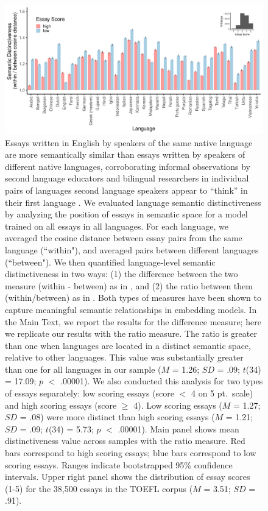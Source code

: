 \documentclass[9pt,twoside,lineno]{pnas-new}
\begin{document}
\begin{figure}[h]
\centering
\includegraphics[width=16.7cm]{suppfigs/distinctiveness_fig.pdf}


  \caption{Essays written in English by speakers of the same native language are more semantically similar than essays written by speakers of different native languages, corroborating informal observations by second language educators and bilingual researchers in individual pairs of languages second language speakers appear to ``think'' in their first language \cite{wu2014influence, filipovic2018speaking}. We evaluated language semantic distinctiveness by analyzing the position of essays in semantic space for a model trained on all essays in all languages. For each language, we averaged the cosine distance between essay pairs from the same language (``within"), and averaged  pairs between different languages (``between").  We then quantified language-level semantic distinctiveness in two ways: (1) the difference between the two measure (within - between) as in \cite{kozlowski2019geometry, bodell2019interpretable, an2018semaxis, kwak2020frameaxis}, and (2) the ratio between them (within/between) as in \cite{levy2014linguistic, levy2014neural, levy2015improving}. Both types of measures have been shown to capture meaningful semantic relationships in embedding models. In the Main Text, we report the results for the difference measure; here we replicate our results with the ratio measure. The ratio is greater than one when languages are located in a distinct semantic space, relative to other languages. This value was substantially greater than one for all languages in our sample ($M$ = 1.26; $SD$ = .09; $t$(34) = 17.09; $p$ $<$ .00001). We also conducted  this analysis for two types of essays separately: low scoring essays (score $<$ 4 on 5 pt.\ scale) and high scoring essays (score $\geq$ 4).  Low scoring essays ($M$ = 1.27; $SD$ = .08) were more distinct than high scoring essays ($M$ = 1.21; $SD$ = .09; $t$(34) = 5.73; $p$ $<$ .00001).  Main panel shows mean distinctiveness value across samples with the ratio measure.  Red bars correspond to high scoring essays; blue bars correspond to low scoring essays. Ranges indicate bootstrapped 95\% confidence intervals. Upper right panel shows the distribution of essay scores (1-5) for the 38,500 essays in the TOEFL corpus ($M$ = 3.51; $SD$ = .91).}
\end{figure}
\end{document}
